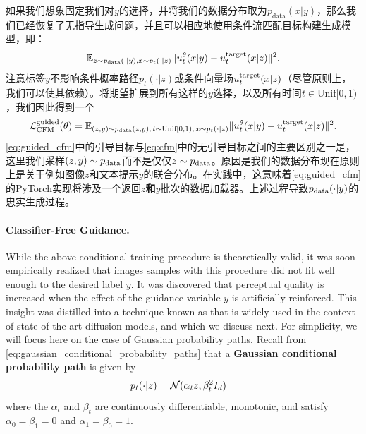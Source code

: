 如果我们想象固定我们对$y$的选择，并将我们的数据分布取为$p_{\text{data}}(x|y)$，那么我们已经恢复了无指导生成问题，并且可以相应地使用条件流匹配目标构建生成模型，即：
\begin{equation}
    \mathbb{E}_{z \sim p_{\text{data}}(\cdot|y), x \sim p_t(\cdot|z)} \lVert u_t^{\theta}(x|y) - u^{\text{target}}_t(x|z)\rVert^2.
\end{equation}
注意标签$y$不影响条件概率路径$p_t(\cdot|z)$或条件向量场$u^{\text{target}}_t(x|z)$（尽管原则上，我们可以使其依赖）。将期望扩展到所有这样的$y$选择，以及所有时间$t \in \text{Unif}[0,1)$，我们因此得到一个
\begin{equation}
    \label{eq:guided_cfm}
    \mathcal{L}_{\text{CFM}}^{\text{guided}}(\theta) = \mathbb{E}_{(z,y) \sim p_{\text{data}}(z,y),\,t\sim \text{Unif}[0,1),\,x\sim p_t(\cdot|z)} \lVert u_t^{\theta}(x|y) - u^{\text{target}}_t(x|z)\rVert^2.
\end{equation}
\cref{eq:guided_cfm}中的引导目标与\cref{eq:cfm}中的无引导目标之间的主要区别之一是，这里我们采样$(z,y) \sim p_{\rm{data}}$而不是仅仅$z \sim p_{\rm{data}}$。原因是我们的数据分布现在原则上是关于例如图像$z$和文本提示$y$的联合分布。在实践中，这意味着\cref{eq:guided_cfm}的PyTorch实现将涉及一个返回\textbf{$z$和$y$}批次的数据加载器。上述过程导致$p_{\rm{data}}(\cdot|y)$的忠实生成过程。


\paragraph{Classifier-Free Guidance.} While the above conditional training procedure is theoretically valid, it was soon empirically realized that images samples with this procedure did not fit well enough to the desired label $y$. It was discovered that perceptual quality is increased when the effect of the guidance variable $y$ is artificially reinforced. This insight was distilled into a technique known as  that is widely used in the context of state-of-the-art diffusion models, and which we discuss next. For simplicity, we will focus here on the case of Gaussian probability paths. Recall from \cref{eq:gaussian_conditional_probability_paths}
 that a \textbf{Gaussian conditional probability path} is given by
\begin{align*}
    p_t(\cdot|z) &= \mathcal{N}(\alpha_t z,\beta_t^2 I_d)
\end{align*}
where the  $\alpha_t$ and $\beta_t$ are continuously differentiable, monotonic, and satisfy $\alpha_0 = \beta_1 = 0$ and $\alpha_1 = \beta_0 = 1$.

